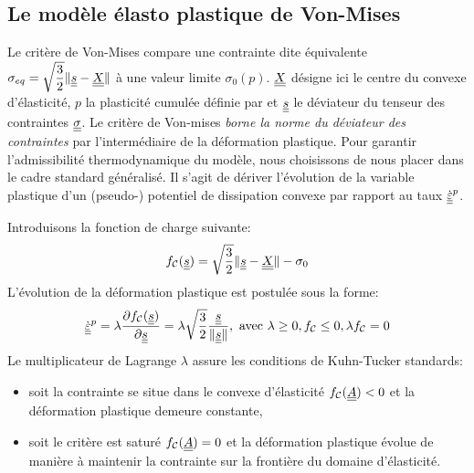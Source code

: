 \documentclass[10pt]{book}
\newcommand{\FthEpsp}{\ten{A}}
\begin{document}
\begin{appendices}
\subsection{Le modèle élasto plastique de Von-Mises}
Le critère de Von-Mises compare une contrainte dite \og équivalente \fg{} $\sigma_{eq}=\sqrt{\dfrac{3}{2}}\Vert \underline{\underline{s}}-\underline{\underline{X}}\Vert$ à une valeur limite $\sigma_{0}(p)$. $\underline{\underline{X}}$ désigne ici le centre du convexe d'élasticité, $p$ la plasticité cumulée définie par et $\underline{\underline{s}}$ le déviateur du tenseur des contraintes $\underline{\underline{\sigma}}$. Le critère de Von-mises \emph{borne la norme du déviateur des contraintes} \cite{maitournam2017materiaux} par l'intermédiaire de la déformation plastique. Pour garantir l'admissibilité thermodynamique du modèle, nous choisissons de nous placer dans le cadre standard généralisé. Il s'agit de dériver l'évolution de la variable plastique d'un (pseudo-) potentiel de dissipation convexe par rapport au taux $\dot{\underline{\underline{\varepsilon}}}^{p}$.

Introduisons la fonction de charge suivante:
$$f_{\mathcal{C}}(\underline{\underline{s}})=\sqrt{\frac{3}{2}}\Vert \underline{\underline{s}}-\underline{\underline{X}}\Vert-\sigma_{0}$$
L'évolution de la déformation plastique est postulée sous la forme:
\begin{equation}
\dot{\underline{\underline{\varepsilon}}}^{p}=\lambda\dfrac{\partial f_{\mathcal{C}}(\underline{\underline{s}})}{\partial\underline{\underline{s}}}=\lambda\sqrt{\dfrac{3}{2}}\dfrac{\underline{\underline{s}}}{\Vert \underline{\underline{s}}\Vert}, \text{ avec } \lambda\geq 0, f_{\mathcal{C}}\leq 0, \lambda f_{\mathcal{C}}=0
\label{eq:evolution variable_interne}
\end{equation}
Le multiplicateur de Lagrange $\lambda$ assure les conditions de Kuhn-Tucker standards:
\begin{itemize}
\item soit la contrainte se situe dans le convexe d'élasticité $\FChargeConvexe(\FthEpsp)< 0$ et la déformation plastique demeure constante,
\item soit le critère est saturé $\FChargeConvexe(\FthEpsp)=0$ et la déformation plastique évolue de manière à maintenir la contrainte sur la frontière du domaine d'élasticité.
\end{itemize}

\end{appendices}
\end{document}

